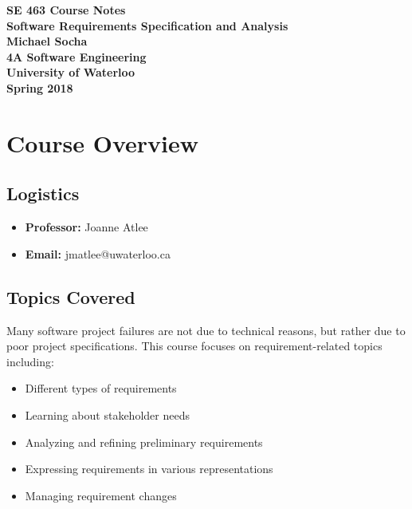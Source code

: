 \documentclass[12pt,titlepage]{article}
\begin{document}
  \begin{titlepage}
    \vspace*{\fill}
    \centering

    \textbf{\Huge SE 463 Course Notes} \\ [0.4em]
    \textbf{\Large Software Requirements Specification and Analysis} \\ [1em]
    \textbf{\Large Michael Socha} \\ [1em]
    \textbf{\large 4A Software Engineering} \\
    \textbf{\large University of Waterloo} \\
    \textbf{\large Spring 2018} \\
    \vspace*{\fill}
  \end{titlepage}

  \newpage 

  \tableofcontents

  \newpage

  \section{Course Overview}
    \subsection{Logistics}
      \begin{itemize}
        \item \textbf{Professor:} Joanne Atlee
        \item \textbf{Email:} jmatlee@uwaterloo.ca
      \end{itemize}

    \subsection{Topics Covered}
      Many software project failures are not due to technical reasons, but rather due to poor project specifications. This course
      focuses on requirement-related topics including:
      \begin{itemize}
        \item Different types of requirements
        \item Learning about stakeholder needs
        \item Analyzing and refining preliminary requirements
        \item Expressing requirements in various representations
        \item Managing requirement changes
      \end{itemize}
\end{document}
